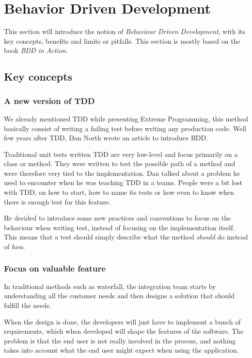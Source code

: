 \section{Behavior Driven Development}\label{sec:bdd}

This section will introduce the notion of \textit{Behaviour Driven
Development}, with its key concepts, benefits and limits or pitfalls.
This section is mostly based on the book \textit{BDD in Action}.

\subsection{Key concepts}\label{subsec:key-concepts}

\subsubsection{A new version of TDD}
We already mentioned TDD while presenting Extreme Programming, this method
basically consist of writing a failing test before writing any production code.
Well few years after TDD, Dan North wrote an article to introduce BDD\@.

Traditional unit tests written TDD are very low-level and focus primarily on
a class or method.
They were written to test the possible path of a method and were therefore very
tied to the implementation.
Dan talked about a problem he used to encounter when he was teaching TDD in
a teams.
People were a bit lost with TDD, on how to start, how to name its tests or how
even to know when there is enough test for this feature.

He decided to introduce some new practices and conventions to focus on the
behaviour when writing test, instead of focusing on the implementation itself.
This means that a test should simply describe what the method \textit{should}
do instead of \textit{how}.

\subsubsection{Focus on valuable feature}
In traditional methods such as waterfall, the integration team starts by
understanding all the customer needs and then designs a solution that should
fulfill the needs.

When the design is done, the developers will just have to implement a bunch
of requirements, which when developed will shape the features of the software.
The problem is that the end user is not really involved in the process, and
nothing takes into account what the end user might expect when using the
application.

